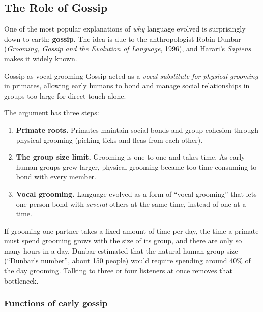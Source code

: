 \subsection{The Role of Gossip}
\label{sec:gossip}

One of the most popular explanations of \emph{why} language evolved is surprisingly
down-to-earth: \textbf{gossip}. The idea is due to the anthropologist Robin Dunbar
(\emph{Grooming, Gossip and the Evolution of Language}, 1996), and Harari's
\emph{Sapiens} makes it widely known.

\begin{nbfact}{Gossip as vocal grooming}
Gossip acted as a \emph{vocal substitute for physical grooming} in primates, allowing
early humans to bond and manage social relationships in groups too large for direct
touch alone.
\end{nbfact}

The argument has three steps:
\begin{enumerate}[nosep]
  \item \textbf{Primate roots.} Primates maintain social bonds and group cohesion through
        physical grooming (picking ticks and fleas from each other).
  \item \textbf{The group size limit.} Grooming is one-to-one and takes time. As early
        human groups grew larger, physical grooming became too time-consuming to bond
        with every member.
  \item \textbf{Vocal grooming.} Language evolved as a form of ``vocal grooming'' that
        lets one person bond with \emph{several} others at the same time, instead of one
        at a time.
\end{enumerate}

\begin{nbintuition}
If grooming one partner takes a fixed amount of time per day, the time a primate must
spend grooming grows with the size of its group, and there are only so many hours in a
day. Dunbar estimated that the natural human group size (``Dunbar's number'', about 150
people) would require spending around 40\% of the day grooming. Talking to three or four
listeners at once removes that bottleneck.
\end{nbintuition}

\subsubsection{Functions of early gossip}

